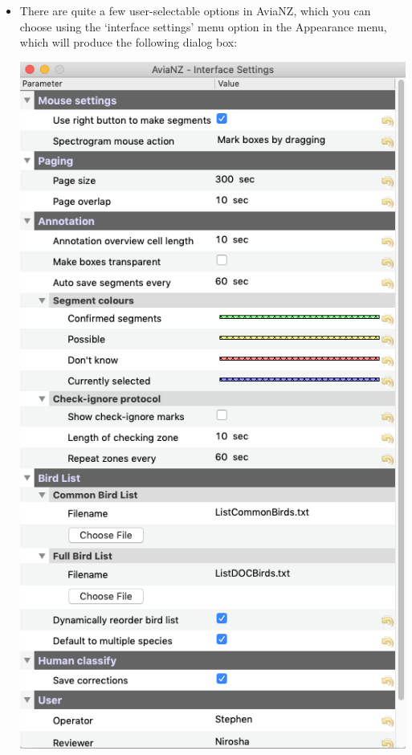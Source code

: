 \documentclass{article}
\begin{document}
\begin{itemize}
\item There are quite a few user-selectable options in AviaNZ, which you can choose using the `interface settings' menu option in the Appearance menu, which will produce the following dialog box:
\begin{center}
    \includegraphics[width=.4\textwidth]{Figs/interfacesettings}
\end{center}


\end{itemize}
\end{document}
